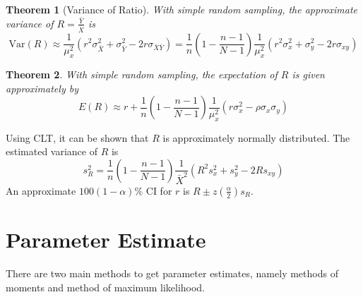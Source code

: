 \documentclass[12pt]{article}
\newcommand{\var}{\mathrm{Var}}
\newtheorem{theorem}{Theorem}[section]
\theoremstyle{definition}
\begin{document}
\begin{theorem}[Variance of Ratio]
\normalfont With simple random sampling, the approximate variance of $R=\frac{\bar{Y}}{\bar{X}}$ is
\[
\var(R)\approx \frac{1}{\mu_x^2}(r^2\sigma_{\bar{X}}^2+\sigma_{\bar{Y}}^2-2r\sigma_{\bar{X}\bar{Y}})=\frac{1}{n}(1-\frac{n-1}{N-1})\frac{1}{\mu_x^2}(r^2\sigma_x^2+\sigma_y^2-2r\sigma_{xy})
\]
\end{theorem}
\begin{theorem}
\normalfont With simple random sampling, the expectation of $R$ is given approximately by
\[
E(R)\approx r+\frac{1}{n}(1-\frac{n-1}{N-1})\frac{1}{\mu_x^2}(r\sigma_x^2-\rho\sigma_x\sigma_y)
\]
\end{theorem}
Using CLT, it can be shown that $R$ is approximately normally distributed. The estimated variance of $R$ is 
\[
s_R^2 = \frac{1}{n}(1-\frac{n-1}{N-1})\frac{1}{\bar{X}^2}(R^2s_x^2+s_y^2-2Rs_{xy})
\]
An approximate $100(1-\alpha)\%$ CI for $r$ is $R\pm z(\frac{\alpha}{2})s_R$.
\section{Parameter Estimate}
There are two main methods to get parameter estimates, namely methods of moments and method of maximum likelihood.
\end{document}

